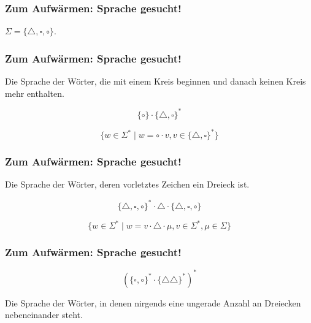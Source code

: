 \begin{frame}
	\frametitle{Zum Aufwärmen: Sprache gesucht!} $\Sigma = \{ \triangle, \square, \circ \}$.\\
\end{frame}

%	

\begin{frame}
	\frametitle{Zum Aufwärmen: Sprache gesucht!}
	
	Die Sprache der Wörter, die mit einem Kreis beginnen und danach keinen Kreis mehr enthalten.
	\vspace{15mm}
	\pause
	
	$$ \{\circ\} \cdot \{\triangle, \square\}^* $$
	\vspace{15mm}
	\pause
	
	$$ \{w \in \Sigma^* \mid w = \circ \cdot v, v \in \{\triangle, \square\}^* \} $$

\end{frame}

\begin{frame}
	\frametitle{Zum Aufwärmen: Sprache gesucht!}
	
	Die Sprache der Wörter, deren vorletztes Zeichen ein Dreieck ist.
	\vspace{15mm}
	\pause
	
	$$ \{\triangle, \square, \circ\}^* \cdot \triangle \cdot \{\triangle, \square, \circ\} $$
	\vspace{15mm}
	\pause

	$$ \{w \in \Sigma^* \mid w = v \cdot \triangle \cdot \mu, v \in \Sigma^*, \mu \in \Sigma \} $$

	
\end{frame}

\begin{frame}
	\frametitle{Zum Aufwärmen: Sprache gesucht!}
	
	$$ (\{\square, \circ\}^* \cdot \{\triangle\triangle\}^* )^* $$
	\vspace{15mm}
	\pause

	Die Sprache der Wörter, in denen nirgends eine ungerade Anzahl an Dreiecken nebeneinander steht.
\end{frame}

